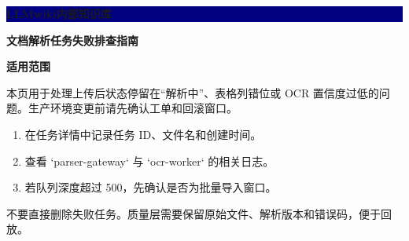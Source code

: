 \documentclass{article}
\begin{document}
\pagecolor{white}
\colorbox{navy}{\parbox[c][17mm][c]{104mm}{\centering\color{white}\fontsize{13}{16}\selectfont\bfseries LLMwiki\hspace{10mm}\scriptsize 内部知识库}}
\vspace{4mm}
\noindent{}\par
\vspace{1mm}
\noindent\hspace*{7mm}\parbox[t]{96mm}{\raggedright\color{navy}\fontsize{14}{18}\selectfont\bfseries 文档解析任务失败排查指南}\par
\vspace{1mm}
\noindent{}\par\vspace{4mm}
\colorbox{pale}{\parbox{96mm}{\vspace{3mm}\hspace{3mm}\textbf{适用范围}\par\hspace{3mm}\small 本页用于处理上传后状态停留在“解析中”、表格列错位或 OCR 置信度过低的问题。生产环境变更前请先确认工单和回滚窗口。\vspace{3mm}}}\par
\vspace{4mm}\par
\begin{enumerate}[leftmargin=7mm,itemsep=1mm]\item 在任务详情中记录任务 ID、文件名和创建时间。\item 查看 `parser-gateway` 与 `ocr-worker` 的相关日志。\item 若队列深度超过 500，先确认是否为批量导入窗口。\end{enumerate}
\colorbox{warn}{\parbox{96mm}{\vspace{3mm}\par\hspace{3mm}\small 不要直接删除失败任务。质量层需要保留原始文件、解析版本和错误码，便于回放。\vspace{3mm}}}\par
\vspace{4mm}\par
\end{document}
